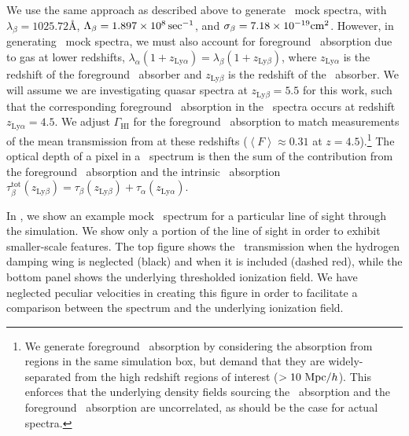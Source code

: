 We use the same approach as described above to generate \lyb\ mock spectra, with $\lambda_{\beta} = 1025.72\text{\AA}$, $\Lambda_\beta = 1.897 \times 10^{8}\sec^{-1}$, and $\sigma_\beta = 7.18 \times 10^{-19}\text{cm}^{2}$. However, in generating \lyb\ mock spectra, we must also account for foreground \lya\ absorption due to gas at lower redshifts, $\lambda_\alpha (1+z_{\text{Ly}\alpha}) = \lambda_{\beta}(1 + z_{\text{Ly}\beta})$, where $z_{\text{Ly}\alpha}$ is the redshift of the foreground \lya\ absorber and $z_{\text{Ly}\beta}$ is the redshift of the \lyb\ absorber. We will assume we are investigating quasar spectra at $z_{\text{Ly}\beta} =  5.5$ for this work, such that the corresponding foreground \lya\ absorption in the \lyb\ spectra occurs at redshift $z_{\text{Ly}\alpha} = 4.5$. We adjust $\Gamma_{\text{HI}}$ for the foreground \lya\ absorption to match measurements of the mean transmission from \citet{2013MNRAS.430.2067B} at these redshifts ($\left\langle F \right\rangle \approx 0.31$ at $z = 4.5$).\footnote{We generate foreground \lya\ absorption by considering the absorption from regions in the same simulation box, but demand that they are widely-separated from the high redshift regions of interest ($>10\ \text{Mpc/$h$}$). This enforces that the underlying density fields sourcing the \lyb\ absorption and the foreground \lya\ absorption are uncorrelated, as should be the case for actual spectra.} The optical depth of a pixel in a \lyb\ spectrum is then the sum of the contribution from the foreground \lya\ absorption and the intrinsic \lyb\ absorption $\tau_\beta^{\text{tot}}(z_{\text{Ly}\beta}) = \tau_{\beta}(z_{\text{Ly}\beta}) + \tau_{\alpha}(z_{\text{Ly}\alpha})$.


In , we show an example mock \lya\ spectrum for a particular line of sight through the simulation. We show only a portion of the line of sight in order to exhibit smaller-scale features. The top figure shows the \lya\ transmission when the hydrogen damping wing is neglected (black) and when it is included (dashed red), while the bottom panel shows the underlying thresholded ionization field. We have neglected peculiar velocities in creating this figure in order to facilitate a comparison between the spectrum and the underlying ionization field. 



